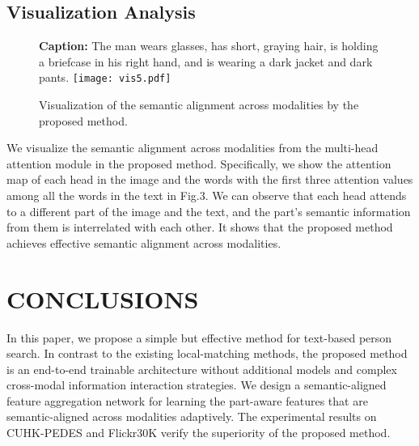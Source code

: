\documentclass{article}
\begin{document}
\subsection{Visualization Analysis}
\begin{figure}


\setlength{\abovecaptionskip}{0.5cm}
\setlength{\belowcaptionskip}{-0.5cm}
\vspace{1em}
\begin{spacing}{0.6}
{\scriptsize \textbf{Caption:} The man wears glasses, has short, graying hair, is holding a briefcase in his right hand, and is wearing a dark jacket and dark pants.
}
\centering
\label{vv}
\texttt{[image: vis5.pdf]}
\vspace{-1em}\caption{Visualization of the semantic alignment across modalities by the proposed method.}
\end{spacing}
\vspace{0.5em}
\end{figure}
We visualize the semantic alignment across modalities from the multi-head attention module in the proposed method. Specifically, we show the attention map of each head in the image and the words with the first three attention values among all the words in the text in Fig.3. We can observe that each head attends to a different part of the image and the text, and the part's semantic information from them is interrelated with each other. It shows that the proposed method achieves effective semantic alignment across modalities.
\section{CONCLUSIONS}
\label{sec:conclusions}
\par In this paper, we propose a simple but effective method for text-based person search. In contrast to the existing local-matching methods, the proposed method is an end-to-end trainable architecture without additional models and complex cross-modal information interaction strategies. We design a semantic-aligned feature aggregation network for learning the part-aware features that are semantic-aligned across modalities adaptively. The experimental results on CUHK-PEDES and Flickr30K verify the superiority of the proposed method.





\end{document}
